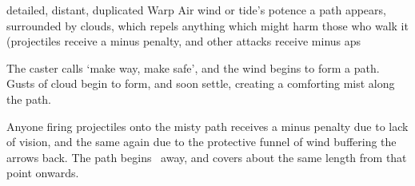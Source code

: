   {detailed, distant, duplicated}%
  {Warp}%
  {Air}%
  {wind or tide's potence}%
  {a path appears, surrounded by clouds, which repels anything which might harm those who walk it (projectiles receive a minus  penalty, and other attacks receive minus  \glspl{ap}}%
  {
    The caster calls `make way, make safe', and the wind begins to form a path.
    Gusts of cloud begin to form, and soon settle, creating a comforting mist along the path.

    Anyone firing projectiles onto the misty path receives a minus  penalty due to lack of vision, and the same again due to the protective funnel of wind buffering the arrows back.
    The path begins \spellRange\ away, and covers about the same length from that point onwards.
}

